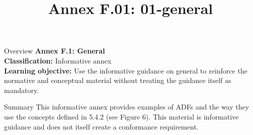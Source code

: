 \documentclass[10pt,letterpaper]{article}
\title{Annex F.01: 01-general}
\author{}
\date{}
\begin{document}
\maketitle
\begin{CornellOverviewBox}{Overview}
{\Large\bfseries\textcolor{CNavy}{Annex F.1: General}}\\[3pt]
{\small\textbf{Classification:} Informative annex}\\
{\small\textbf{Learning objective:} Use the informative guidance on general to reinforce the normative and conceptual material without treating the guidance itself as mandatory.}
\end{CornellOverviewBox}
\vspace{3pt}

\begin{CornellNotesTable}
\end{CornellNotesTable}


\begin{CornellSummaryBox}{Summary}
This informative annex provides examples of ADFs and the way they use the concepts defined in 5.4.2 (see Figure 6). This material is informative guidance and does not itself create a conformance requirement.
\end{CornellSummaryBox}
\end{document}
